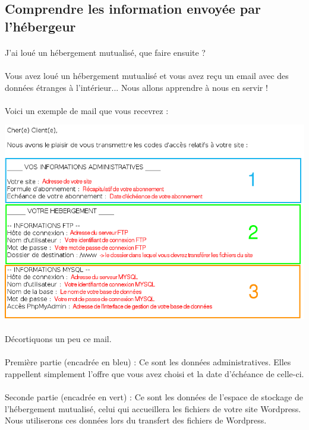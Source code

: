 \documentclass[10pt,a4paper]{article}
\begin{document}
\subsection{Comprendre les information envoyée par l'hébergeur}
\paragraph{}J'ai loué un hébergement mutualisé, que faire ensuite ?
\paragraph{}Vous avez loué un hébergement mutualisé et vous avez reçu un email avec des données étranges à l'intérieur... Nous allons apprendre à nous en servir !
\paragraph{}Voici un exemple de mail que vous recevrez :
\begin{center}
\includegraphics[scale=0.4]{img/0009.png}
\end{center}
\paragraph{}Décortiquons un peu ce mail.
\paragraph{}Première partie (encadrée en bleu) : Ce sont les données administratives. Elles rappellent simplement l'offre que vous avez choisi et la date d'échéance de celle-ci.
\paragraph{}Seconde partie (encadrée en vert) : Ce sont les données de l'espace de stockage de l'hébergement mutualisé, celui qui accueillera les fichiers de votre site Wordpress. Nous utiliserons ces données lors du transfert des fichiers de Wordpress.
\end{document}
